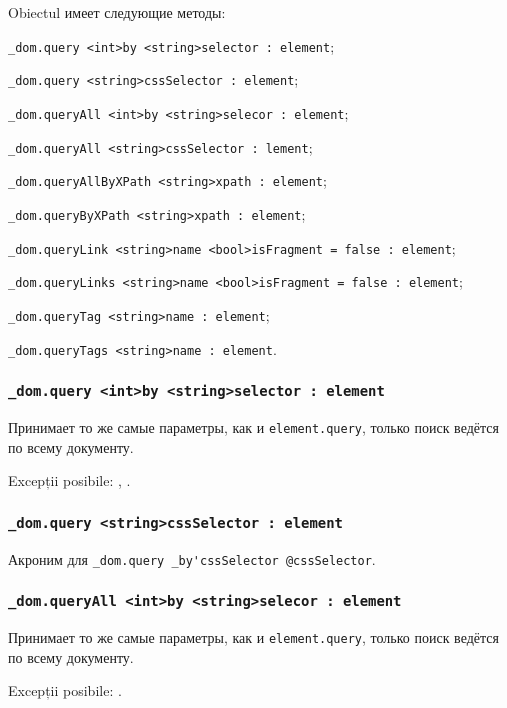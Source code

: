 Obiectul \dom{} имеет следующие методы:
\begin{icItems}
	\item \lstinline|_dom.query <int>by <string>selector : element|;
	\item \lstinline|_dom.query <string>cssSelector : element|;
	\item \lstinline|_dom.queryAll <int>by <string>selecor : element|;
	\item \lstinline|_dom.queryAll <string>cssSelector : lement|;
	\item \lstinline|_dom.queryAllByXPath <string>xpath : element|;
	\item \lstinline|_dom.queryByXPath <string>xpath : element|;
	\item \lstinline|_dom.queryLink <string>name <bool>isFragment = false : element|;
	\item \lstinline|_dom.queryLinks <string>name <bool>isFragment = false : element|;
	\item \lstinline|_dom.queryTag <string>name : element|;
	\item \lstinline|_dom.queryTags <string>name : element|.
\end{icItems}

\subsubsection{\lstinline|_dom.query <int>by <string>selector : element|}

Принимает то же самые параметры, как и \lstinline|element.query|, только поиск ведётся по всему документу.

Excepții posibile: , .

\subsubsection{\lstinline|_dom.query <string>cssSelector : element|}

Акроним для \lstinline|_dom.query _by'cssSelector @cssSelector|.

\subsubsection{\lstinline|_dom.queryAll <int>by <string>selecor : element|}

Принимает то же самые параметры, как и \lstinline|element.query|, только поиск ведётся по всему документу.

Excepții posibile: .

